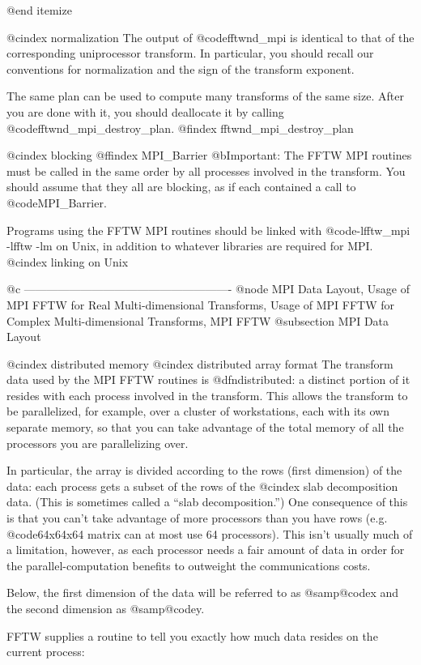 @end itemize

@cindex normalization
The output of @code{fftwnd_mpi} is identical to that of the
corresponding uniprocessor transform.  In particular, you should recall
our conventions for normalization and the sign of the transform
exponent.

The same plan can be used to compute many transforms of the same size.
After you are done with it, you should deallocate it by calling
@code{fftwnd_mpi_destroy_plan}.
@findex fftwnd_mpi_destroy_plan

@cindex blocking
@ffindex MPI_Barrier
@b{Important:} The FFTW MPI routines must be called in the same order by
all processes involved in the transform.  You should assume that they
all are blocking, as if each contained a call to @code{MPI_Barrier}.

Programs using the FFTW MPI routines should be linked with
@code{-lfftw_mpi -lfftw -lm} on Unix, in addition to whatever libraries
are required for MPI.
@cindex linking on Unix

@c -------------------------------------------------------
@node MPI Data Layout, Usage of MPI FFTW for Real Multi-dimensional Transforms, Usage of MPI FFTW for Complex Multi-dimensional Transforms, MPI FFTW
@subsection MPI Data Layout

@cindex distributed memory
@cindex distributed array format
The transform data used by the MPI FFTW routines is @dfn{distributed}: a
distinct portion of it resides with each process involved in the
transform.  This allows the transform to be parallelized, for example,
over a cluster of workstations, each with its own separate memory, so
that you can take advantage of the total memory of all the processors
you are parallelizing over.

In particular, the array is divided according to the rows (first
dimension) of the data: each process gets a subset of the rows of the
@cindex slab decomposition
data.  (This is sometimes called a ``slab decomposition.'')  One
consequence of this is that you can't take advantage of more processors
than you have rows (e.g. @code{64x64x64} matrix can at most use 64
processors).  This isn't usually much of a limitation, however, as each
processor needs a fair amount of data in order for the
parallel-computation benefits to outweight the communications costs.

Below, the first dimension of the data will be referred to as
@samp{@code{x}} and the second dimension as @samp{@code{y}}.

FFTW supplies a routine to tell you exactly how much data resides on the
current process:


